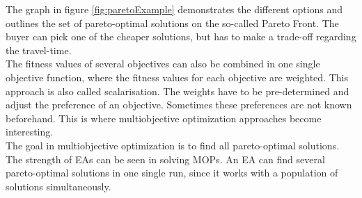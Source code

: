     The graph in figure \ref{fig:paretoExample} demonstrates the different options and outlines the set of pareto-optimal solutions on the so-called Pareto Front. The buyer can pick one of the cheaper solutions, but has to make a trade-off regarding the travel-time.\\
    The fitness values of several objectives can also be combined in one single objective function, where the fitness values for each objective are weighted. This approach is also called scalarisation\cite{Eiben}. The weights have to be pre-determined and adjust the preference of an objective. Sometimes these preferences are not known beforehand. This is where multiobjective optimization approaches become interesting.\\
    The goal in multiobjective optimization is to find all pareto-optimal solutions. The strength of EAs can be seen in solving MOPs. An EA can find several pareto-optimal solutions in one single run, since it works with a population of solutions simultaneously\cite{Deb:2002}.
    
